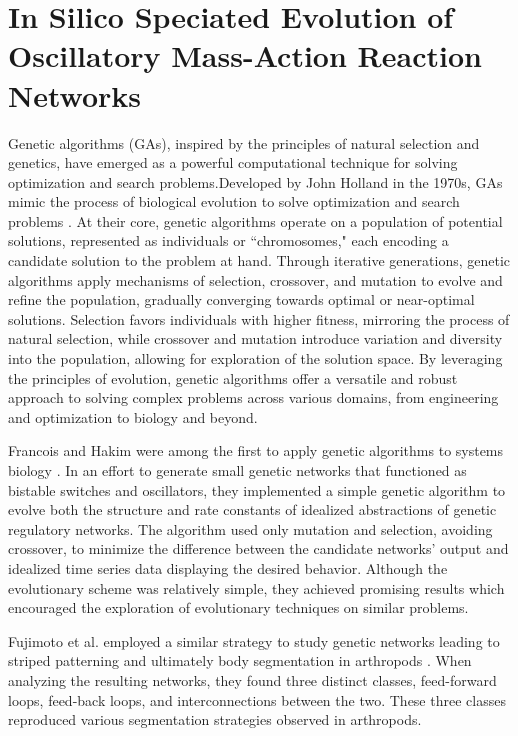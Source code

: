 \documentclass[12pt]{report}
\begin{document}
\chapter{In Silico Speciated Evolution of Oscillatory Mass-Action Reaction Networks}
\label{chap: NetEvolve}
Genetic algorithms (GAs), inspired by the principles of natural selection and genetics, have emerged as a powerful computational technique for solving optimization and search problems.Developed by John Holland in the 1970s, GAs mimic the process of biological evolution to solve optimization and search problems \cite{holland_1975}. At their core, genetic algorithms operate on a population of potential solutions, represented as individuals or ``chromosomes," each encoding a candidate solution to the problem at hand. Through iterative generations, genetic algorithms apply mechanisms of selection, crossover, and mutation to evolve and refine the population, gradually converging towards optimal or near-optimal solutions. Selection favors individuals with higher fitness, mirroring the process of natural selection, while crossover and mutation introduce variation and diversity into the population, allowing for exploration of the solution space. By leveraging the principles of evolution, genetic algorithms offer a versatile and robust approach to solving complex problems across various domains, from engineering and optimization to biology and beyond.

Francois and Hakim were among the first to apply genetic algorithms to systems biology \cite{francois_hakim_2004}. In an effort to generate small genetic networks that functioned as bistable switches and oscillators, they implemented a simple genetic algorithm to evolve both the structure and rate constants of idealized abstractions of genetic regulatory networks. The  algorithm used only mutation and selection, avoiding crossover, to minimize the difference between the candidate networks' output and idealized time series data displaying the desired behavior. Although the evolutionary scheme was relatively simple, they achieved promising results which encouraged the exploration of evolutionary techniques on similar problems.

Fujimoto et al. employed a similar strategy to study genetic networks leading to striped patterning and ultimately body segmentation in arthropods \cite{fujimoto_network_2008}. When analyzing the resulting networks, they found three distinct classes, feed-forward loops, feed-back loops, and interconnections between the two. These three classes reproduced various segmentation strategies observed in arthropods.
\end{document}
